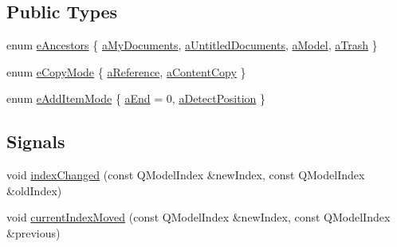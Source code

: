 \subsection*{Public Types}
\begin{DoxyCompactItemize}
\item 
enum \hyperlink{class_u_b_document_tree_model_a9b80affd329bc9cce123a12fd5e5bd26}{e\-Ancestors} \{ \hyperlink{class_u_b_document_tree_model_a9b80affd329bc9cce123a12fd5e5bd26ad77cd45a59e7e605cc85e414cc081998}{a\-My\-Documents}, 
\hyperlink{class_u_b_document_tree_model_a9b80affd329bc9cce123a12fd5e5bd26a6012fce090686d05d50378fab42314ab}{a\-Untitled\-Documents}, 
\hyperlink{class_u_b_document_tree_model_a9b80affd329bc9cce123a12fd5e5bd26aafd606546a4347c121e374e21fb0bedd}{a\-Model}, 
\hyperlink{class_u_b_document_tree_model_a9b80affd329bc9cce123a12fd5e5bd26a09aef5e5d9251f262fa5f8bf6b7f2ac9}{a\-Trash}
 \}
\item 
enum \hyperlink{class_u_b_document_tree_model_a8a3b8a397b5435e7f07bfa8de0061150}{e\-Copy\-Mode} \{ \hyperlink{class_u_b_document_tree_model_a8a3b8a397b5435e7f07bfa8de0061150acc3cab6ff862b626c218a67ad866bac1}{a\-Reference}, 
\hyperlink{class_u_b_document_tree_model_a8a3b8a397b5435e7f07bfa8de0061150ae5f574b2da79238736ec21d9f1b865e4}{a\-Content\-Copy}
 \}
\item 
enum \hyperlink{class_u_b_document_tree_model_a07efcb98db28114b23cdf3da63859911}{e\-Add\-Item\-Mode} \{ \hyperlink{class_u_b_document_tree_model_a07efcb98db28114b23cdf3da63859911a1cc25e5740e54fde5fd93717ec7b262b}{a\-End} =  0, 
\hyperlink{class_u_b_document_tree_model_a07efcb98db28114b23cdf3da63859911a78c8d816499c7816445704e5d7e7fbf3}{a\-Detect\-Position}
 \}
\end{DoxyCompactItemize}
\subsection*{Signals}
\begin{DoxyCompactItemize}
\item 
void \hyperlink{class_u_b_document_tree_model_a37270653f0c2e90bc8d459f809f785c8}{index\-Changed} (const Q\-Model\-Index \&new\-Index, const Q\-Model\-Index \&old\-Index)
\item 
void \hyperlink{class_u_b_document_tree_model_a9ec074ea59f6c2eb73cc54369233b07d}{current\-Index\-Moved} (const Q\-Model\-Index \&new\-Index, const Q\-Model\-Index \&previous)
\end{DoxyCompactItemize}
